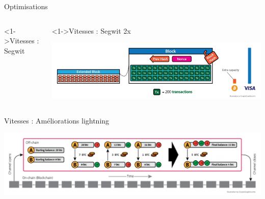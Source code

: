 \documentclass[presentation]{beamer}
\begin{document}
\begin{frame}[label={sec:org0e58eaa}]{Optimisations}
\begin{columns}
\begin{column}{0.46\columnwidth}
\begin{block}<1->{Vitesses : Segwit}
\end{block}
\end{column}
\begin{column}{0.46\columnwidth}
\begin{block}<1->{Vitesses : Segwit 2x}
\begin{center}
\includegraphics[width=\textwidth]{Images/segWit2x.png}
\end{center}
\end{block}
\end{column}
\end{columns}

\begin{block}{Vitesses : Améliorations lightning}
\begin{center}
\includegraphics[width=\textwidth]{Images/payment-channels.png}
\end{center}
\end{block}
\end{frame}
\end{document}
